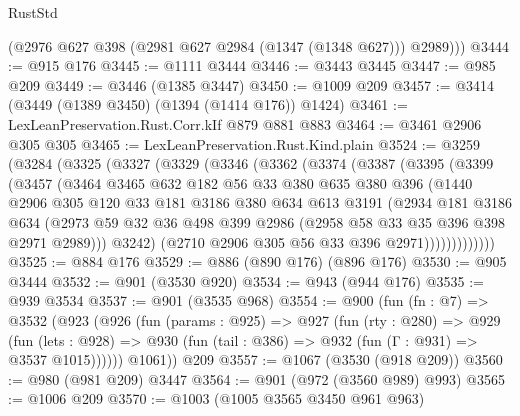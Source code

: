 \begin{lexlean}{RustStd}
\begin{coremodule}
        (@2976 @627 @398 (@2981 @627 @2984 (@1347 (@1348 @627))) @2989)))
@3444 := @915 @176
@3445 := @1111 @3444
@3446 := @3443 @3445
@3447 := @985 @209
@3449 := @3446 (@1385 @3447)
@3450 := @1009 @209
@3457 := @3414 (@3449 (@1389 @3450) (@1394 (@1414 @176)) @1424)
@3461 := LexLeanPreservation.Rust.Corr.kIf @879 @881 @883
@3464 := @3461 @2906 @305 @305
@3465 := LexLeanPreservation.Rust.Kind.plain
@3524 := @3259
    (@3284
      (@3325
        (@3327
          (@3329
            (@3346
              (@3362
                (@3374
                  (@3387
                    (@3395
                      (@3399
                        (@3457
                          (@3464
                            @3465
                            @632
                            @182
                            @56
                            @33
                            @380
                            @635
                            @380
                            @396
                            (@1440
                              @2906
                              @305
                              @120
                              @33
                              @181
                              @3186
                              @380
                              @634
                              @613
                              @3191
                              (@2934
                                @181
                                @3186
                                @634
                                (@2973
                                  @59
                                  @32
                                  @36
                                  @498
                                  @399
                                  @2986
                                  (@2958 @58 @33 @35 @396 @398 @2971 @2989)))
                              @3242)
                            (@2710 @2906 @305 @56 @33 @396 @2971)))))))))))))
@3525 := @884 @176
@3529 := @886 (@890 @176) (@896 @176)
@3530 := @905 @3444
@3532 := @901 (@3530 @920)
@3534 := @943 (@944 @176)
@3535 := @939 @3534
@3537 := @901 (@3535 @968)
@3554 := @900
    (fun (fn : @7) =>
    @3532
      (@923
        (@926
          (fun (params : @925) =>
          @927
            (fun (rty : @280) =>
            @929
              (fun (lets : @928) =>
              @930 (fun (tail : @386) => @932 (fun (Γ : @931) => @3537 @1015))))))
        @1061))
    @209
@3557 := @1067 (@3530 (@918 @209))
@3560 := @980 (@981 @209) @3447
@3564 := @901 (@972 (@3560 @989) @993)
@3565 := @1006 @209
@3570 := @1003 (@1005 @3565 @3450 @961 @963)

\end{coremodule}
\end{lexlean}
